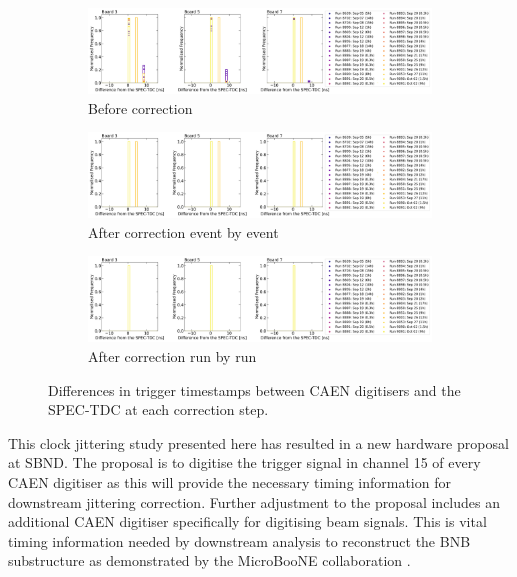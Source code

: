 \begin{figure}[ht!]

\begin{subfigure}[h]{1.00\linewidth}
\centering    
\includegraphics[width=\linewidth]{Tickts_spec}
\caption{Before correction}
\label{subfig:Tickts_spec_Nocorr}
\end{subfigure}
\vspace{0.5cm}
\begin{subfigure}[h]{1.00\linewidth}
\centering    
\includegraphics[width=\linewidth]{Tickts_spec_corrEbyE}
\caption{After correction event by event}
\label{subfig:Tickts_spec_corrEbyE}
\end{subfigure}
\vspace{0.5cm}
\begin{subfigure}[h]{1.00\linewidth}
\centering    
\includegraphics[width=\linewidth]{Tickts_spec_corrRbyR}
\caption{After correction run by run}
\label{subfig:Tickts_spec_corrRbyR}
\end{subfigure}%

\caption[Clock Jittering Correction Steps]{
Differences in trigger timestamps between CAEN digitisers and the SPEC-TDC at each correction step.
}
\label{fig:Tickts_spec_corr}
\end{figure}

This clock jittering study presented here has resulted in a new hardware proposal at SBND.
The proposal is to digitise the trigger signal in channel 15 of every CAEN digitiser as this will provide the necessary timing information for downstream jittering correction.
Further adjustment to the proposal includes an additional CAEN digitiser specifically for digitising beam signals.
This is vital timing information needed by downstream analysis to reconstruct the BNB substructure as demonstrated by the MicroBooNE collaboration \cite{uboone_ns}. 

